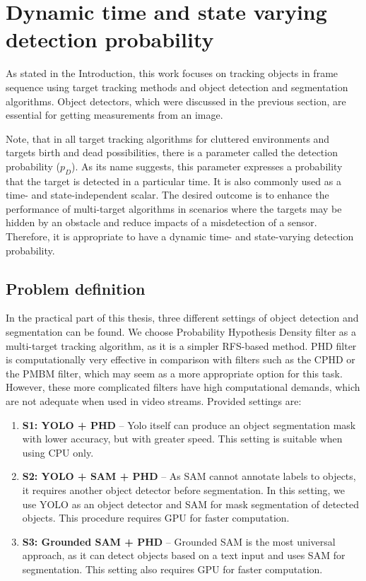 \chapter{Dynamic time and state varying detection probability}
As stated in the Introduction, this work focuses on tracking objects in frame sequence using target tracking methods
and
object detection
and
segmentation algorithms. Object detectors, which were discussed in the previous section, are essential for getting
measurements
from an image.

Note, that in all target tracking algorithms for cluttered environments and targets
birth and dead possibilities, there is a parameter called the detection probability ($p_D$). As its name
suggests, this parameter expresses a probability that the target is detected in \linebreak a particular time. It is also commonly
used
as a
time- and state-independent scalar. The desired outcome is to enhance the performance of multi-target
algorithms in scenarios where the targets may be hidden by an obstacle and reduce impacts of a misdetection of a sensor.
Therefore, it
is appropriate to have a dynamic time- and state-varying detection probability.
\section{Problem definition}
\label{sec:mphd_problemDef}
In the practical part of this thesis, three different settings of object detection and segmentation can be found.
We choose Probability Hypothesis Density filter as a multi-target tracking algorithm, as it is a simpler
RFS-based method. PHD filter is computationally very effective in comparison with filters such as the CPHD or the
PMBM filter,
which may seem as a more appropriate option for this task. However, these more complicated filters have high
computational demands, which
are not adequate when used in video streams. Provided settings are:
\begin{enumerate}
  \item \textbf{S1: YOLO + PHD} -- Yolo itself can produce an object segmentation mask with lower accuracy, but with
  greater
  speed. This setting is suitable when using CPU only.
  \item \textbf{S2: YOLO + SAM + PHD} -- As SAM cannot annotate labels to objects, it requires another object detector
  before segmentation. In this setting, we use YOLO as an object detector and SAM for mask segmentation of detected
  objects. This procedure requires GPU for faster computation.
  \item \textbf{S3: Grounded SAM + PHD} -- Grounded SAM is the most universal approach, as it can detect objects based
  on a text input and uses SAM for segmentation. This setting also requires GPU for faster computation.
\end{enumerate}


